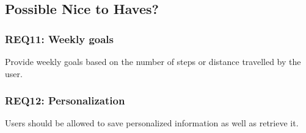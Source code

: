 \documentclass{article}
\begin{document}
	\subsection{Possible Nice to Haves?}
	
			
		\subsubsection{REQ11: Weekly goals}
			Provide weekly goals based on the number of steps or distance travelled by the user.
			
		\subsubsection{REQ12: Personalization}
			Users should be allowed to save personalized information as well as retrieve it.
\end{document}

